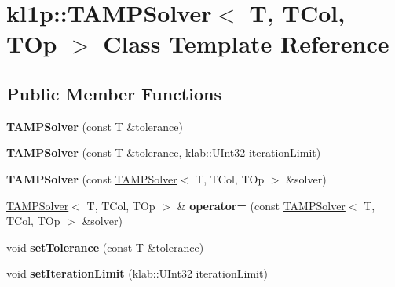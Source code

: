 \hypertarget{classkl1p_1_1TAMPSolver}{}\section{kl1p\+:\+:T\+A\+M\+P\+Solver$<$ T, T\+Col, T\+Op $>$ Class Template Reference}
\label{classkl1p_1_1TAMPSolver}
\subsection*{Public Member Functions}
\begin{DoxyCompactItemize}
\item 
{\bfseries T\+A\+M\+P\+Solver} (const T \&tolerance)\hypertarget{classkl1p_1_1TAMPSolver_a8409842b12ad1edd21a6d757005420bd}{}\label{classkl1p_1_1TAMPSolver_a8409842b12ad1edd21a6d757005420bd}

\item 
{\bfseries T\+A\+M\+P\+Solver} (const T \&tolerance, klab\+::\+U\+Int32 iteration\+Limit)\hypertarget{classkl1p_1_1TAMPSolver_a5076577f06cf910da3db3e197f88b08c}{}\label{classkl1p_1_1TAMPSolver_a5076577f06cf910da3db3e197f88b08c}

\item 
{\bfseries T\+A\+M\+P\+Solver} (const \hyperlink{classkl1p_1_1TAMPSolver}{T\+A\+M\+P\+Solver}$<$ T, T\+Col, T\+Op $>$ \&solver)\hypertarget{classkl1p_1_1TAMPSolver_a46023d22997d73219aeb98b64f141917}{}\label{classkl1p_1_1TAMPSolver_a46023d22997d73219aeb98b64f141917}

\item 
\hyperlink{classkl1p_1_1TAMPSolver}{T\+A\+M\+P\+Solver}$<$ T, T\+Col, T\+Op $>$ \& {\bfseries operator=} (const \hyperlink{classkl1p_1_1TAMPSolver}{T\+A\+M\+P\+Solver}$<$ T, T\+Col, T\+Op $>$ \&solver)\hypertarget{classkl1p_1_1TAMPSolver_aec9102de62ccfcf0bdf4cec34353348d}{}\label{classkl1p_1_1TAMPSolver_aec9102de62ccfcf0bdf4cec34353348d}

\item 
void {\bfseries set\+Tolerance} (const T \&tolerance)\hypertarget{classkl1p_1_1TAMPSolver_a5bb0c3c4917479acc14c799b7edfcd7f}{}\label{classkl1p_1_1TAMPSolver_a5bb0c3c4917479acc14c799b7edfcd7f}

\item 
void {\bfseries set\+Iteration\+Limit} (klab\+::\+U\+Int32 iteration\+Limit)\hypertarget{classkl1p_1_1TAMPSolver_ab4dc6dd8b2bd6c316a1df1c257e8accf}{}\label{classkl1p_1_1TAMPSolver_ab4dc6dd8b2bd6c316a1df1c257e8accf}


\end{DoxyCompactItemize}
